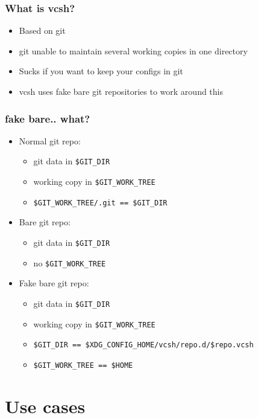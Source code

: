 \documentclass[t]{beamer}
\begin{document}
\begin{frame}
	\frametitle{What is vcsh?}
	\begin{itemize}
		\item Based on git
		\item git unable to maintain several working copies in one directory
		\item Sucks if you want to keep your configs in git
		\item vcsh uses fake bare git repositories to work around this
	\end{itemize}
\end{frame}

\begin{frame}
	\frametitle{fake bare.. what?}
	\begin{itemize}
		\item Normal git repo:
		\begin{itemize}
			\item git data in \texttt{\$GIT\_DIR}
			\item working copy in \texttt{\$GIT\_WORK\_TREE}
			\item \texttt{\$GIT\_WORK\_TREE/.git == \$GIT\_DIR}
		\end{itemize}
		\item Bare git repo:
		\begin{itemize}
			\item git data in \texttt{\$GIT\_DIR}
			\item no  \texttt{\$GIT\_WORK\_TREE}
		\end{itemize}
		\item Fake bare git repo:
		\begin{itemize}
			\item git data in \texttt{\$GIT\_DIR}
			\item working copy in \texttt{\$GIT\_WORK\_TREE}
			\item \texttt{\$GIT\_DIR == \$XDG\_CONFIG\_HOME/vcsh/repo.d/\$repo.vcsh}
			\item \texttt{\$GIT\_WORK\_TREE == \$HOME}
		\end{itemize}
	\end{itemize}
\end{frame}




\section{Use cases}
\end{document}
